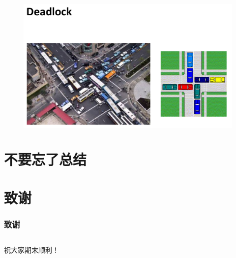\documentclass[AutoFakeBold]{beamer}
\begin{document}
{\begin{frame}
        \begin{figure}
            \includegraphics[width=\textwidth]{figures/zlx3.png}
        \end{figure}
    
    \end{frame}

    \section{不要忘了总结}

    \section*{致谢}

    \begin{frame}
        \frametitle{致谢}
        \begin{columns}
            \begin{column}{.5\linewidth}
                祝大家期末顺利！
                

\end{column}
\end{columns}
\end{frame}}
\end{document}
